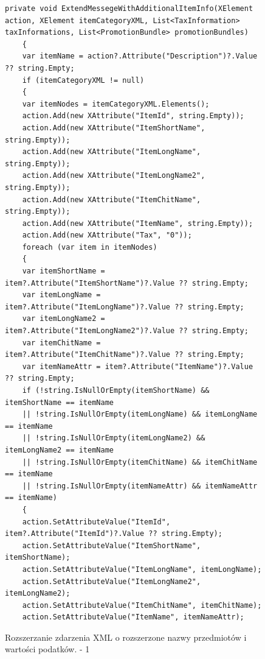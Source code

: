 \documentclass[a4paper]{book}
\begin{document}
\begin{figure}[h]
	\begin{lstlisting}[frame=single, breaklines=true]
	private void ExtendMessegeWithAdditionalItemInfo(XElement action, XElement itemCategoryXML, List<TaxInformation> taxInformations, List<PromotionBundle> promotionBundles)
	{
	var itemName = action?.Attribute("Description")?.Value ?? string.Empty;
	if (itemCategoryXML != null)
	{
	var itemNodes = itemCategoryXML.Elements();
	action.Add(new XAttribute("ItemId", string.Empty));
	action.Add(new XAttribute("ItemShortName", string.Empty));
	action.Add(new XAttribute("ItemLongName", string.Empty));
	action.Add(new XAttribute("ItemLongName2", string.Empty));
	action.Add(new XAttribute("ItemChitName", string.Empty));
	action.Add(new XAttribute("ItemName", string.Empty));
	action.Add(new XAttribute("Tax", "0"));
	foreach (var item in itemNodes)
	{
	var itemShortName = item?.Attribute("ItemShortName")?.Value ?? string.Empty;
	var itemLongName = item?.Attribute("ItemLongName")?.Value ?? string.Empty;
	var itemLongName2 = item?.Attribute("ItemLongName2")?.Value ?? string.Empty;
	var itemChitName = item?.Attribute("ItemChitName")?.Value ?? string.Empty;
	var itemNameAttr = item?.Attribute("ItemName")?.Value ?? string.Empty;	
	if (!string.IsNullOrEmpty(itemShortName) && itemShortName == itemName
	|| !string.IsNullOrEmpty(itemLongName) && itemLongName == itemName
	|| !string.IsNullOrEmpty(itemLongName2) && itemLongName2 == itemName
	|| !string.IsNullOrEmpty(itemChitName) && itemChitName == itemName
	|| !string.IsNullOrEmpty(itemNameAttr) && itemNameAttr == itemName)
	{
	action.SetAttributeValue("ItemId", item?.Attribute("ItemId")?.Value ?? string.Empty);
	action.SetAttributeValue("ItemShortName", itemShortName);
	action.SetAttributeValue("ItemLongName", itemLongName);
	action.SetAttributeValue("ItemLongName2", itemLongName2);
	action.SetAttributeValue("ItemChitName", itemChitName);
	action.SetAttributeValue("ItemName", itemNameAttr);
	\end{lstlisting}
	\caption{Rozszerzanie zdarzenia XML o rozszerzone nazwy przedmiotów i wartości podatków. - 1}
	\label{lst:rozszerzanieXML1}
\end{figure}
\end{document}
